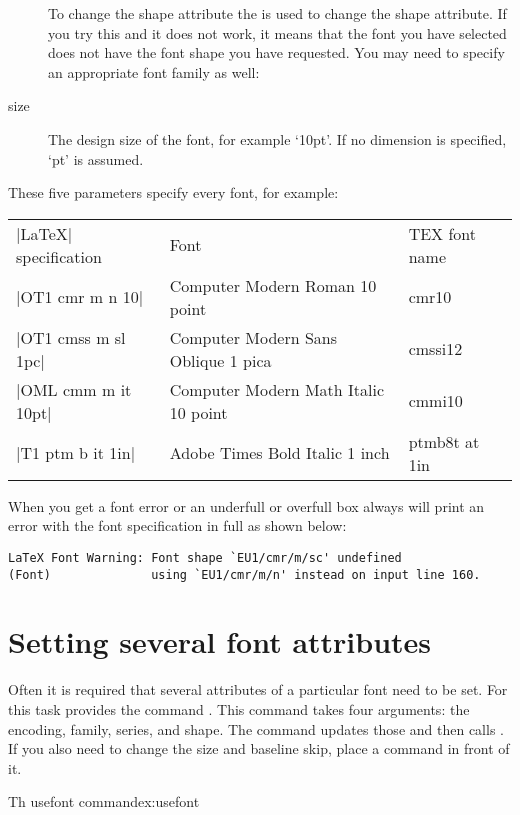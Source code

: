 \begin{description}
To change the shape attribute the  is used to change the shape
attribute. If you try this and it does not work, it means that the font you have selected
does not have the font shape you have requested. You may need to specify an appropriate
font family as well:

{  \raggedright \lorem}

\item[size] The design size of the font, for example `10pt'. If no dimension is specified, `pt' is assumed.
\end{description}

These five parameters specify every \latex
font, for example:

\begin{longtable}{lll}
|LaTeX| specification &Font  &TEX font name\\
|OT1 cmr m n 10|      &Computer Modern Roman 10 point &cmr10\\
|OT1 cmss m sl 1pc|   &Computer Modern Sans Oblique 1 pica &cmssi12\\
|OML cmm m it 10pt|   &Computer Modern Math Italic 10 point &cmmi10\\
|T1 ptm b it 1in|  &Adobe Times Bold Italic 1 inch &ptmb8t at 1in\\
\end{longtable}

When you get a font error or an underfull or overfull box \tex always will print an error with the font specification in full as shown below:

\begin{verbatim}
LaTeX Font Warning: Font shape `EU1/cmr/m/sc' undefined
(Font)              using `EU1/cmr/m/n' instead on input line 160.
\end{verbatim}

\section{Setting several font attributes}

Often it is required that several attributes of a particular font need to be set. For this
task \latex provides the command . This command takes four arguments: the encoding, family, series, and shape. The command updates those and then calls . If you also need to change the size and baseline skip, place
a  command in front of it. 

\begin{texexample}{Th usefont command}{ex:usefont}
\bgroup
\fontsize{12}{14pt}
\lorem
\egroup
\end{texexample}

